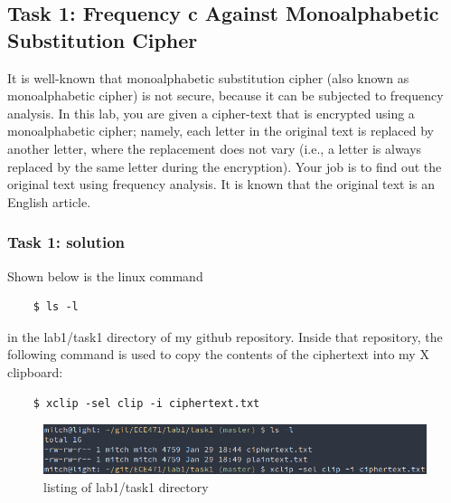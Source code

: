 \documentclass[12pt]{article}
\begin{document}
\subsection{Task 1: Frequency c Against Monoalphabetic Substitution Cipher}
    
It is well-known that monoalphabetic substitution cipher (also known as monoalphabetic cipher) is not secure, because it can be subjected to frequency analysis. In this lab, you are given a cipher-text that is encrypted using a monoalphabetic cipher; namely, each letter in the original text is replaced by another letter, where the replacement does not vary (i.e., a letter is always replaced by the same letter during the encryption). Your job is to find out the original text using frequency analysis. It is known that the original text is an English article.

\subsubsection{Task 1: solution}

Shown below is the linux command 
\begin{verbatim}
    $ ls -l 
\end{verbatim}
in the lab1/task1 directory of my github repository. Inside that repository, the following command is used to copy the contents of the ciphertext into my X clipboard:
\begin{verbatim}
    $ xclip -sel clip -i ciphertext.txt
\end{verbatim}

\begin{figure}[!ht]
\includegraphics[scale=0.65]{c0.png}
\caption{listing of lab1/task1 directory}
\label{fig:c0}
\end{figure}
\end{document}
